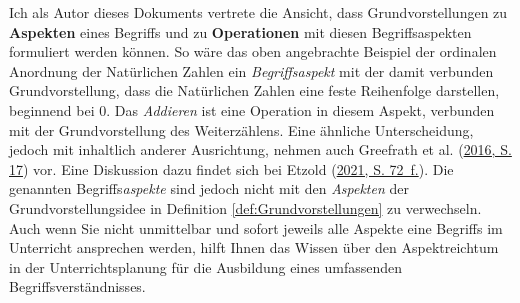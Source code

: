 \documentclass[
]{scrbook}
\theoremstyle{definition}
\theoremstyle{definition}
\theoremstyle{definition}
\theoremstyle{definition}
\theoremstyle{remark}
\begin{document}
Ich als Autor dieses Dokuments vertrete die Ansicht, dass Grundvorstellungen zu \textbf{Aspekten} eines Begriffs und zu \textbf{Operationen} mit diesen Begriffsaspekten formuliert werden können. So wäre das oben angebrachte Beispiel der ordinalen Anordnung der Natürlichen Zahlen ein \emph{Begriffsaspekt} mit der damit verbunden Grundvorstellung, dass die Natürlichen Zahlen eine feste Reihenfolge darstellen, beginnend bei \(0\). Das \emph{Addieren} ist eine Operation in diesem Aspekt, verbunden mit der Grundvorstellung des Weiterzählens. Eine ähnliche Unterscheidung, jedoch mit inhaltlich anderer Ausrichtung, nehmen auch Greefrath et al. (\protect\hyperlink{ref-Greefrath2016}{2016, S. 17}) vor. Eine Diskussion dazu findet sich bei Etzold (\protect\hyperlink{ref-Etzold2021}{2021, S. 72~f.}). Die genannten Begriffs\emph{aspekte} sind jedoch nicht mit den \emph{Aspekten} der Grundvorstellungsidee in Definition \ref{def:Grundvorstellungen} zu verwechseln.
Auch wenn Sie nicht unmittelbar und sofort jeweils alle Aspekte eine Begriffs im Unterricht ansprechen werden, hilft Ihnen das Wissen über den Aspektreichtum in der Unterrichtsplanung für die Ausbildung eines umfassenden Begriffsverständnisses.
\end{document}
